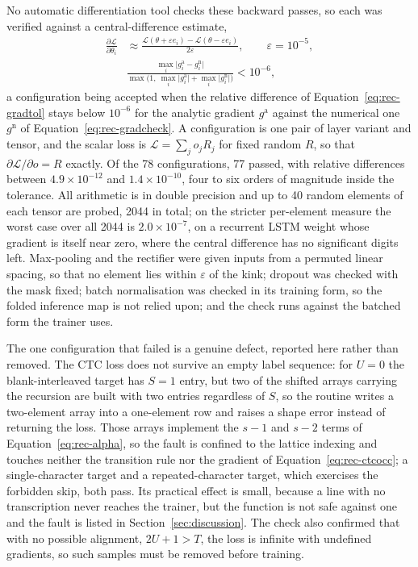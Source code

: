 No automatic differentiation tool checks these backward passes, so each was verified against a central-difference estimate,
\begin{align}
\frac{\partial\mathcal L}{\partial\theta_i}&\approx\frac{\mathcal L(\theta+\varepsilon e_i)-\mathcal L(\theta-\varepsilon e_i)}{2\varepsilon},\qquad\varepsilon=10^{-5},\label{eq:rec-gradcheck}\\
&\frac{\max_i\lvert g_i^{\mathrm{a}}-g_i^{\mathrm{n}}\rvert}{\max\bigl(1,\ \max_i\lvert g_i^{\mathrm{a}}\rvert+\max_i\lvert g_i^{\mathrm{n}}\rvert\bigr)}<10^{-6},\label{eq:rec-gradtol}
\end{align}
a configuration being accepted when the relative difference of Equation~\ref{eq:rec-gradtol} stays below $10^{-6}$ for the analytic gradient $g^{\mathrm a}$ against the numerical one $g^{\mathrm n}$ of Equation~\ref{eq:rec-gradcheck}.
A configuration is one pair of layer variant and tensor, and the scalar loss is $\mathcal L=\sum_j o_jR_j$ for fixed random $R$, so that $\partial\mathcal L/\partial o=R$ exactly.
Of the 78 configurations, 77 passed, with relative differences between $4.9\times10^{-12}$ and $1.4\times10^{-10}$, four to six orders of magnitude inside the tolerance.
All arithmetic is in double precision and up to 40 random elements of each tensor are probed, 2044 in total; on the stricter per-element measure the worst case over all 2044 is $2.0\times10^{-7}$, on a recurrent LSTM weight whose gradient is itself near zero, where the central difference has no significant digits left.
Max-pooling and the rectifier were given inputs from a permuted linear spacing, so that no element lies within $\varepsilon$ of the kink; dropout was checked with the mask fixed; batch normalisation was checked in its training form, so the folded inference map is not relied upon; and the check runs against the batched form the trainer uses.

The one configuration that failed is a genuine defect, reported here rather than removed.
The CTC loss does not survive an empty label sequence: for $U=0$ the blank-interleaved target has $S=1$ entry, but two of the shifted arrays carrying the recursion are built with two entries regardless of $S$, so the routine writes a two-element array into a one-element row and raises a shape error instead of returning the loss.
Those arrays implement the $s-1$ and $s-2$ terms of Equation~\ref{eq:rec-alpha}, so the fault is confined to the lattice indexing and touches neither the transition rule nor the gradient of Equation~\ref{eq:rec-ctcocc}; a single-character target and a repeated-character target, which exercises the forbidden skip, both pass.
Its practical effect is small, because a line with no transcription never reaches the trainer, but the function is not safe against one and the fault is listed in Section~\ref{sec:discussion}.
The check also confirmed that with no possible alignment, $2U+1>T$, the loss is infinite with undefined gradients, so such samples must be removed before training.

